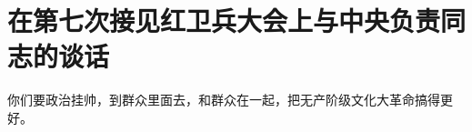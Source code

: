 \section[在第七次接见红卫兵大会上与中央负责同志的谈话（一九六六年十一月十日）]{在第七次接见红卫兵大会上与中央负责同志的谈话}


你们要政治挂帅，到群众里面去，和群众在一起，把无产阶级文化大革命搞得更好。

